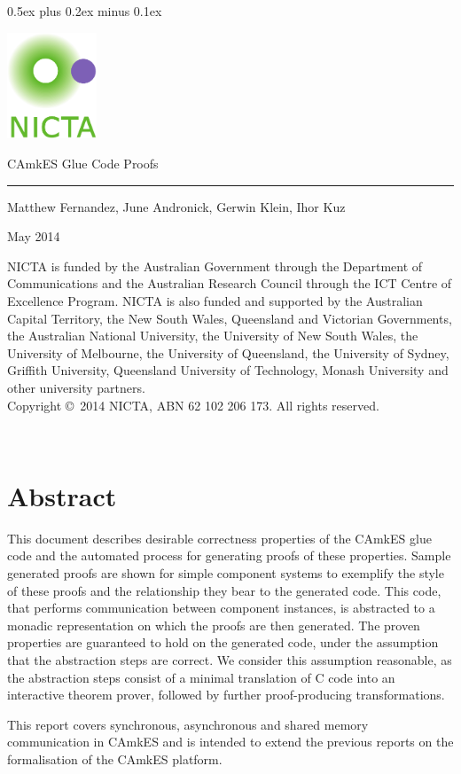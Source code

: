 \documentclass[11pt,a4paper]{scrreprt}
\date{\small\today}
\date{}
\newcommand{\camkes}{CAmkES\xspace}
\newcommand{\titl}{CAmkES Glue Code Proofs}
\newcommand{\authors}{Matthew Fernandez, June Andronick, Gerwin Klein, Ihor Kuz}
\newcommand{\nictafundingacknowledgement}{%
NICTA is funded by the Australian Government through the Department of Communications and the Australian Research Council through the ICT Centre of Excellence Program. NICTA is also funded and supported by the Australian Capital Territory, the New South Wales, Queensland and Victorian Governments, the Australian National University, the University of New South Wales, the University of Melbourne, the University of Queensland, the University of Sydney, Griffith University, Queensland University of Technology, Monash University and other university partners.}
\newcommand{\ABN}{ABN 62 102 206 173}
\newcommand{\cpright}{Copyright \copyright\ 2014 NICTA, \ABN.  All rights reserved.}
\newcommand{\bigdisclaimer}{%
\nictafundingacknowledgement\\

\cpright}
\newcommand{\pgstyle}{%
\fancyhf{}%
\renewcommand{\headrulewidth}{0pt}%
\fancyfoot[C]{}%
\fancyfoot[L]{}%
\fancyfoot[R]{\sl\thepage}}
\begin{document}
\parindent 0pt\parskip 0.5ex plus 0.2ex minus 0.1ex


\begin{center}
 \includegraphics[width=0.2\textwidth]{imgs/NICTA_logo}
\end{center}

\vspace{14ex}
\textsf{\huge \titl}


\vspace{4ex}
\rule{0.85\textwidth}{5pt}
\vspace{4ex}

{\large \authors

\vspace{2ex}
May 2014}

\vfill
{\small
\bigdisclaimer
}

\thispagestyle{empty}
\newpage
~
\restoregeometry

\fancypagestyle{empty}{\pgstyle}
\pagestyle{empty}


\cleardoublepage

\chapter*{Abstract}

This document describes desirable correctness properties of the \camkes glue
code and the automated process for generating proofs of these properties.
Sample generated proofs are shown for simple component systems to exemplify the
style of these proofs and the relationship they bear to the generated code.
This code, that performs communication between component instances, is
abstracted to a monadic representation on which the proofs are then generated.
The proven properties are guaranteed to hold on the generated code, under the
assumption that the abstraction steps are correct.
We consider this assumption reasonable, as the abstraction steps consist of a
minimal translation of C code into an interactive theorem prover, followed by further
proof-producing transformations.

This report covers synchronous, asynchronous and shared memory communication in
\camkes and is intended to extend the previous reports on the formalisation of
the \camkes platform.

\cleardoublepage
\tableofcontents







\end{document}
